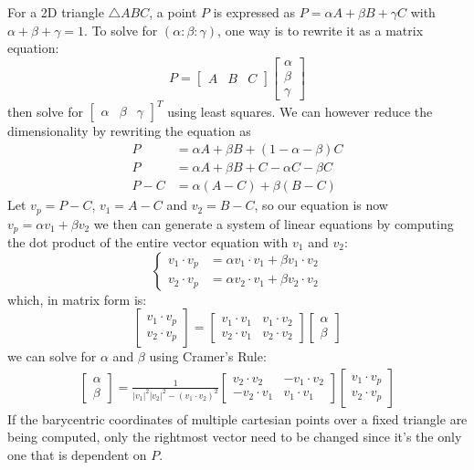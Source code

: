 \documentclass[12pt]{report}
\begin{document}
For a 2D triangle $\triangle ABC$, a point $P$ is expressed as $P = \alpha A + \beta B + \gamma C$ with $\alpha + \beta + \gamma = 1$. To solve for $(\alpha : \beta : \gamma)$, one way is to rewrite it as a matrix equation:
$$
P = 
\begin{bmatrix}
	A & B & C 
\end{bmatrix}
\begin{bmatrix}
	\alpha \\ \beta \\ \gamma
\end{bmatrix}
$$
then solve for $\begin{bmatrix}\alpha & \beta & \gamma\end{bmatrix}^T$ using least squares. We can however reduce the dimensionality by rewriting the equation as
\begin{align*}
	P     & = \alpha A + \beta B + (1 - \alpha - \beta) C \\
	P     & = \alpha A + \beta B + C - \alpha C - \beta C \\
	P - C & = \alpha (A - C) + \beta (B - C)              
\end{align*}
Let $v_p = P - C$, $v_1 = A - C$ and $v_2 = B - C$, so our equation is now $v_p = \alpha v_1 + \beta v_2$ we then can generate a system of linear equations by computing the dot product of the entire vector equation with $v_1$ and $v_2$:
$$
\begin{cases}
	v_1 \cdot v_p & = \alpha v_1 \cdot v_1 + \beta v_1 \cdot v_2 \\
	v_2 \cdot v_p & = \alpha v_2 \cdot v_1 + \beta v_2 \cdot v_2 
\end{cases}
$$
which, in matrix form is:
$$
\begin{bmatrix}
	v_1 \cdot v_p \\
	v_2 \cdot v_p 
\end{bmatrix}
= 
\begin{bmatrix}
	v_1 \cdot v_1 & v_1 \cdot v_2 \\
	v_2 \cdot v_1 & v_2 \cdot v_2 
\end{bmatrix}
\begin{bmatrix}
	\alpha \\ \beta
\end{bmatrix}
$$
we can solve for $\alpha$ and $\beta$ using Cramer's Rule:
\begin{align}
	\begin{bmatrix}
	\alpha \\ \beta
	\end{bmatrix} =
	\frac{1}{|v_1|^2|v_2|^2 - (v_1 \cdot v_2)^2}
	\begin{bmatrix}
	v_2 \cdot v_2  & -v_1 \cdot v_2 \\
	-v_2 \cdot v_1 & v_1 \cdot v_1  
	\end{bmatrix}
	\begin{bmatrix}
	v_1 \cdot v_p \\
	v_2 \cdot v_p
	\end{bmatrix}
\end{align}
If the barycentric coordinates of multiple cartesian points over a fixed triangle are being computed, only the rightmost vector need to be changed since it's the only one that is dependent on $P$.
	
\end{document}

